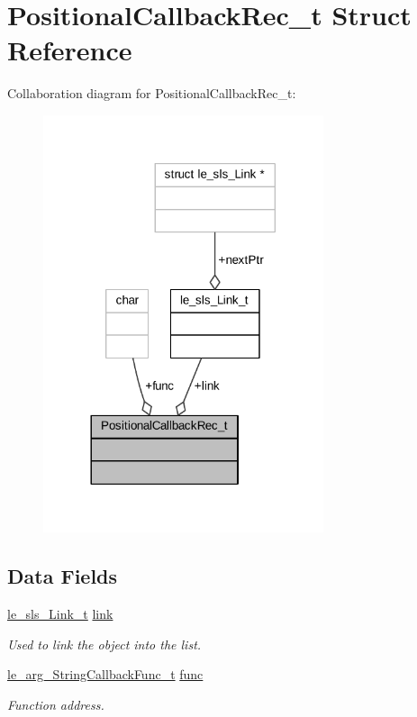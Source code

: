 \hypertarget{struct_positional_callback_rec__t}{}\section{Positional\+Callback\+Rec\+\_\+t Struct Reference}
\label{struct_positional_callback_rec__t}


Collaboration diagram for Positional\+Callback\+Rec\+\_\+t\+:
\nopagebreak
\begin{figure}[H]
\begin{center}
\leavevmode
\includegraphics[width=233pt]{struct_positional_callback_rec__t__coll__graph}
\end{center}
\end{figure}
\subsection*{Data Fields}
\begin{DoxyCompactItemize}
\item 
\hyperlink{structle__sls___link__t}{le\+\_\+sls\+\_\+\+Link\+\_\+t} \hyperlink{struct_positional_callback_rec__t_a4b97acd846773b5aecd04700421e01ab}{link}
\begin{DoxyCompactList}\small\item\em Used to link the object into the list. \end{DoxyCompactList}\item 
\hyperlink{le__args_8h_a6069a3f8abaa2b43dd89d84c356bf796}{le\+\_\+arg\+\_\+\+String\+Callback\+Func\+\_\+t} \hyperlink{struct_positional_callback_rec__t_a7a639dc0f2caa7dcb03664e3d96b2471}{func}
\begin{DoxyCompactList}\small\item\em Function address. \end{DoxyCompactList}\end{DoxyCompactItemize}


